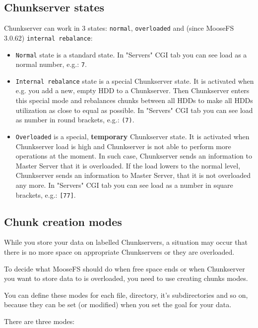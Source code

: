 \documentclass[a4paper,11pt,english]{report}
\def\code#1{\texttt{#1}}
\begin{document}
			\subsection{Chunkserver states}
			Chunkserver can work in 3 states: \code{normal}, \code{overloaded} and (since MooseFS 3.0.62) \code{internal rebalance}:
			
			\begin{itemize}
				\item \code{Normal} state is a standard state. In "Servers" CGI tab you can see load as a normal number, e.g.: \code{7}.
				\item \code{Internal rebalance} state is a special Chunkserver state. It is activated when e.g. you add a new, empty HDD to a Chunkserver. Then Chunkserver enters this special mode and rebalances chunks between all HDDs to make all HDDs utilization as close to equal as possible. In "Servers" CGI tab you can see load as number in round brackets, e.g.: \code{(7)}.
				\item \code{Overloaded} is a special, \textbf{temporary} Chunkserver state. It is activated when Chunkserver load is high and Chunkserver is not able to perform more operations at the moment. In such case, Chunkserver sends an information to Master Server that it is overloaded. If the load lowers to the normal level, Chunkserver sends an information to Master Server, that it is not overloaded any more. In "Servers" CGI tab you can see load as a number in square brackets, e.g.: \code{[77]}.
			\end{itemize}
	

			\subsection{Chunk creation modes}
			While you store your data on labelled Chunkservers, a situation may occur that there is no more space on appropriate Chunkservers or they are overloaded.
			
			To decide what MooseFS should do when free space ends or when Chunkserver you want to store data to is overloaded, you need to use creating chunks modes.
			
			You can define these modes for each file, directory, it's subdirectories and so on, because they can be set (or modified) when you set the goal for your data.
			
			There are three modes:
			
\end{document}
